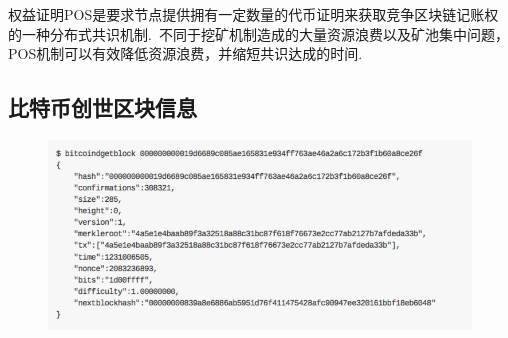 \documentclass[a4paper,12pt,titlepage]{ctexart}
\begin{document}
权益证明POS是要求节点提供拥有一定数量的代币证明来获取竞争区块链记账权的一种分布式共识机制.~不同于挖矿机制造成的大量资源浪费以及矿池集中问题，POS机制可以有效降低资源浪费，并缩短共识达成的时间.~


\subsection{比特币创世区块信息}
\begin{figure}[!hbp]
	\centering
	\includegraphics[scale=0.7]{fig3.jpg}
\end{figure}
\end{document}
